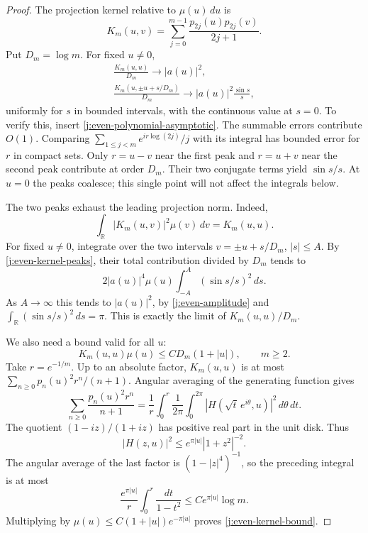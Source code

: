 \begin{proof}
The projection kernel relative to $\mu(u)\,du$ is
\[
 K_m(u,v)=\sum_{j=0}^{m-1}\frac{p_{2j}(u)p_{2j}(v)}{2j+1}.
\]
Put $D_m=\log m$. For fixed $u\ne0$,
\begin{equation}\label{j:even-kernel-peaks}
 \begin{gathered}
 \frac{K_m(u,u)}{D_m}\longrightarrow |a(u)|^2,\\
 \frac{K_m(u,\pm u+s/D_m)}{D_m}
 \longrightarrow |a(u)|^2\frac{\sin s}{s},
 \end{gathered}
\end{equation}
uniformly for $s$ in bounded intervals, with the continuous value at
$s=0$. To verify this, insert
\eqref{j:even-polynomial-asymptotic}. The summable errors contribute
$O(1)$. Comparing
$\sum_{1\le j<m}e^{ir\log(2j)}/j$ with its integral has bounded error
for $r$ in compact sets. Only $r=u-v$ near the first peak and $r=u+v$
near the second peak contribute at order $D_m$. Their two conjugate
terms yield $\sin s/s$. At $u=0$ the peaks coalesce; this single point
will not affect the integrals below.

The two peaks exhaust the leading projection norm. Indeed,
\[
 \int_{\mathbb R}|K_m(u,v)|^2\mu(v)\,dv=K_m(u,u).
\]
For fixed $u\ne0$, integrate over the two intervals
$v=\pm u+s/D_m$, $|s|\le A$. By
\eqref{j:even-kernel-peaks}, their total contribution divided by $D_m$
tends to
\[
 2|a(u)|^4\mu(u)\int_{-A}^A(\sin s/s)^2\,ds.
\]
As $A\to\infty$ this tends to $|a(u)|^2$, by
\eqref{j:even-amplitude} and
$\int_{\mathbb R}(\sin s/s)^2\,ds=\pi$. This is exactly the limit of
$K_m(u,u)/D_m$.

We also need a bound valid for all $u$:
\begin{equation}\label{j:even-kernel-bound}
 K_m(u,u)\mu(u)\le C D_m(1+|u|),\qquad m\ge2.
\end{equation}
Take $r=e^{-1/m}$. Up to an absolute factor, $K_m(u,u)$ is at most
$\sum_{n\ge0}p_n(u)^2r^n/(n+1)$. Angular averaging of the generating
function gives
\[
 \sum_{n\ge0}\frac{p_n(u)^2r^n}{n+1}
 =\frac1r\int_0^r\frac1{2\pi}
       \int_0^{2\pi}|H(\sqrt t\,e^{i\theta},u)|^2\,d\theta\,dt.
\]
The quotient $(1-iz)/(1+iz)$ has positive real part in the unit disk.
Thus
\[
 |H(z,u)|^2\le e^{\pi|u|}|1+z^2|^{-2}.
\]
The angular average of the last factor is $(1-|z|^4)^{-1}$, so the
preceding integral is at most
\[
 \frac{e^{\pi|u|}}r\int_0^r\frac{dt}{1-t^2}
 \le C e^{\pi|u|}\log m.
\]
Multiplying by $\mu(u)\le C(1+|u|)e^{-\pi|u|}$ proves
\eqref{j:even-kernel-bound}.


\end{proof}
